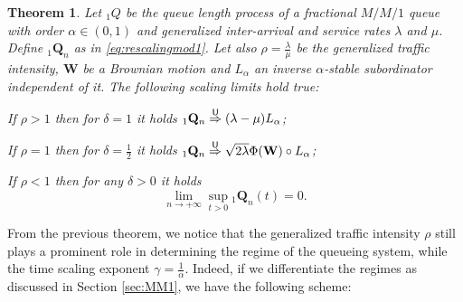 \documentclass[]{amsart}
\numberwithin{equation}{section}
\newtheorem{thm}{Theorem}[section]
\theoremstyle{remark}
\theoremstyle{definition}
\begin{document}
\begin{thm}\label{thm:model1scaling}
	Let ${}_1Q$ be the queue length process of a fractional $M/M/1$ queue with order $\alpha \in (0,1)$ and generalized inter-arrival and service rates $\lambda$ and $\mu$. Define ${}_1\mathbf{Q}_n$ as in \eqref{eq:rescalingmod1}. Let also $\rho=\frac{\lambda}{\mu}$ be the generalized traffic intensity, $\mathbf{W}$ be a Brownian motion and $L_\alpha$ an inverse $\alpha$-stable subordinator independent of it. The following scaling limits hold true:
	\begin{itemize}
		\item[$(i)$] If $\rho>1$ then for $\delta=1$ it holds 
			${}_1\mathbf{Q}_n \overset{\sf U}{\Rightarrow} (\lambda-\mu)L_\alpha$;
		\item[$(ii)$] If $\rho=1$ then for $\delta=\frac{1}{2}$ it holds ${}_1\mathbf{Q}_n \overset{\sf U}{\Rightarrow} \sqrt{2\lambda}\Phi(\mathbf{W}) \circ L_\alpha$;
		{\item[$(iii)$] If $\rho<1$ then for any $\delta>0$ it holds 
		\begin{equation*}
			\lim_{n \to +\infty}\sup_{t>0}{}_1\mathbf{Q}_n(t)=0.
		\end{equation*}	
			}
	\end{itemize}
\end{thm}
From the previous theorem, we notice that the generalized traffic intensity $\rho$ still plays a prominent role in determining the regime of the queueing system{, while the time scaling exponent $\gamma=\frac{1}{\alpha}$}. Indeed, if we differentiate the regimes as discussed in Section \ref{sec:MM1}, we have the following scheme:
\end{document}
